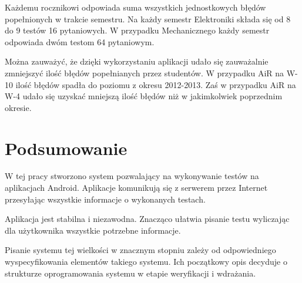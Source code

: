 \documentclass[eng]{mgr}
\begin{document}
	
		Każdemu rocznikowi odpowiada suma wszystkich jednostkowych błędów popełnionych w trakcie semestru. Na każdy semestr Elektroniki składa się od 8 do 9 testów 16 pytaniowych. W przypadku Mechanicznego każdy semestr odpowiada dwóm testom 64 pytaniowym.
		
		Można zauważyć, że dzięki wykorzystaniu aplikacji udało się zauważalnie zmniejszyć ilość błędów popełnianych przez studentów. W przypadku AiR na W-10 ilość błędów spadła do poziomu z okresu 2012-2013. Zaś w przypadku AiR na W-4 udało się uzyskać mniejszą ilość błędów niż w jakimkolwiek poprzednim okresie.
		
	\chapter{Podsumowanie}
	
	W tej pracy stworzono system pozwalający na wykonywanie testów na aplikacjach Android. Aplikacje komunikują się z serwerem przez Internet przesyłając wszystkie informacje o wykonanych testach.
	
	Aplikacja jest stabilna i niezawodna. Znacząco ułatwia pisanie testu wyliczając dla użytkownika wszystkie potrzebne informacje.
	
	Pisanie systemu tej wielkości w znacznym stopniu zależy od odpowiedniego wyspecyfikowania elementów takiego systemu. Ich początkowy opis decyduje o strukturze oprogramowania systemu w etapie weryfikacji i wdrażania.
			
\end{document}
